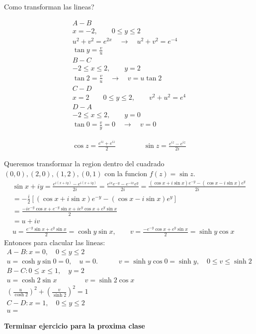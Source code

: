 \documentclass{article}
\newcommand{\caja}[3]{%
  \begin{tcolorbox}[colback=#1!5!white,colframe=#1!25!black,title=#2]
    #3
  \end{tcolorbox}%
}
\begin{document}
\hfill

Como transforman las lineas? 

\begin{gather*}
  A-B \\
  x = - 2, \qquad 0\leq y \leq 2 \\
  u ^2 + v ^2 = e ^ {2x } \quad \rightarrow \quad u ^2 + v ^2 = e ^ {-4} \\
  \tan{y } = \frac{v }{u }\\
  B-C \\
  -2 \leq x \leq 2, \qquad y = 2\\
  \tan{2 } = \frac{v }{u }\quad \rightarrow \quad v = u \tan{2 }\\
  C- D \\
  x = 2 \qquad 0 \leq y \leq 2 , \qquad v ^2 + u ^2 = e ^ {4 }\\
  D-A \\
  -2 \leq x \leq 2 , \qquad y = 0 \\
  \tan{0 } = \frac{v }{y } = 0 \quad \rightarrow \quad v = 0 
\end{gather*}

\caja{red}{Seno y coseno }{
  \begin{gather*}
    \cos{z } = \frac{e ^ {i z } + e ^ {i z }}{2 } \qquad \qquad \sin{z } =  \frac{e ^ {i z } - e ^ {i z }}{2i } 
  \end{gather*}
}

Queremos transformar la region dentro del cuadrado $ (0,0),(2,0),(1,2),(0,1 ) $ con la funcion $ f\left(z\right)=\sin{z } $.
\begin{gather*}
  \sin{x+iy } = \frac{e ^ {i (x+ i y )} - e ^ {i (x+iy )}}{2i } = \frac{e ^ {ix }e ^ {-y } - e ^ {-ix }e ^ {y }}{2i} = \frac{(\cos{x }+ i \sin{x }) e ^ {-y }- (\cos{x } - i \sin{x }) e ^ {y }}{2i }\\
  = -\frac{i }{2}\left[(\cos{x } + i \sin{x })e ^ {-y } - (\cos{x } - i \sin{x })e ^ {y }\right]\\
  = \frac{- i e ^ {-y }\cos{x } + e ^ {-y } \sin{x } + i e ^ {y }\cos{x } +  e ^ {y } \sin{x }}{2}\\
  = u + i v \\
  u = \frac{e ^ {-y }\sin{x } + e ^ {y }\sin{x }}{2} = \cosh{y}\sin{x}, \qquad v  = \frac{-e ^ {-y }\cos{x } + e ^ {y }\sin{x }}{2} = \sinh{y}\cos{x}
\end{gather*}
Entonces para clacular las lineas: 
\begin{gather*}
  A-B: x = 0, \quad 0 \leq y \leq 2 \\
  u = \cosh{y }\sin{0 } = 0, \quad u = 0. \quad \qquad v = \sinh y \cos{0 } = \sinh y , \quad 0 \leq v \leq \sinh 2\\
  B-C: 0 \leq x \leq 1, \quad y = 2 \\
  u = \cosh 2 \sin{x } \qquad \qquad v = \sinh 2 \cos{x }\\
  \left(\frac{u }{\cosh 2 }\right)^2 + \left(\frac{v }{\sinh 2 }\right)^2 = 1\\
  C-D: x = 1, \quad 0 \leq y\leq 2\\
  u = 
\end{gather*}
\caja{black}{}{
\textbf{Terminar ejercicio para la proxima clase}
}
\end{document}
